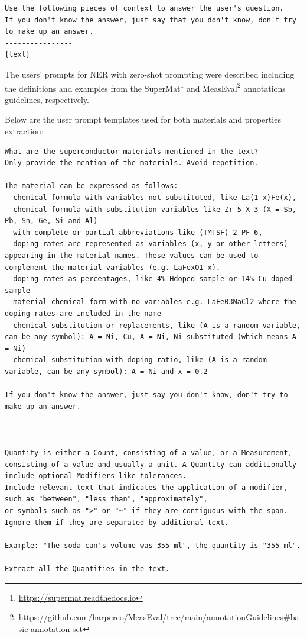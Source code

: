 \begin{lstlisting}[caption=Generic system prompt common to all requests]
Use the following pieces of context to answer the user's question. 
If you don't know the answer, just say that you don't know, don't try to make up an answer. 
----------------
{text}
\end{lstlisting}

The users' prompts for NER with zero-shot prompting were described including the definitions and examples from the SuperMat\footnote{\url{https://supermat.readthedocs.io}} and MeasEval\footnote{\url{https://github.com/harperco/MeasEval/tree/main/annotationGuidelines\#basic-annotation-set}} annotations guidelines, respectively.  

Below are the user prompt templates used for both materials and properties extraction: 

\begin{lstlisting}[caption=User prompt designed for extracting materials and properties. The entity descriptions are separated by dashed lines ("\texttt{------}").]
What are the superconductor materials mentioned in the text? 
Only provide the mention of the materials. Avoid repetition. 

The material can be expressed as follows:
- chemical formula with variables not substituted, like La(1-x)Fe(x),
- chemical formula with substitution variables like Zr 5 X 3 (X = Sb, Pb, Sn, Ge, Si and Al)
- with complete or partial abbreviations like (TMTSF) 2 PF 6,
- doping rates are represented as variables (x, y or other letters) appearing in the material names. These values can be used to complement the material variables (e.g. LaFexO1-x).
- doping rates as percentages, like 4% Hdoped sample or 14% Cu doped sample
- material chemical form with no variables e.g. LaFe03NaCl2 where the doping rates are included in the name
- chemical substitution or replacements, like (A is a random variable, can be any symbol): A = Ni, Cu, A = Ni, Ni substituted (which means A = Ni)
- chemical substitution with doping ratio, like (A is a random variable, can be any symbol): A = Ni and x = 0.2

If you don't know the answer, just say you don't know, don't try to make up an answer.

-----

Quantity is either a Count, consisting of a value, or a Measurement, 
consisting of a value and usually a unit. A Quantity can additionally include optional Modifiers like tolerances.
Include relevant text that indicates the application of a modifier, such as "between", "less than", "approximately", 
or symbols such as ">" or "~" if they are contiguous with the span. Ignore them if they are separated by additional text.
 
Example: "The soda can's volume was 355 ml", the quantity is "355 ml".

Extract all the Quantities in the text.
\end{lstlisting}

